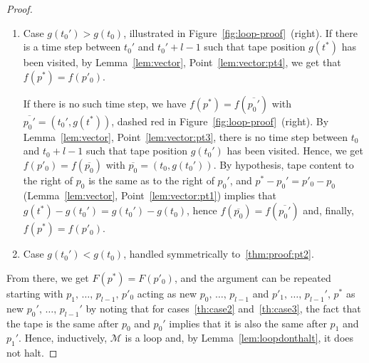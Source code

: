 \begin{proof}
\begin{enumerate}
        \item Case $g(t_0') > g(t_0)$, illustrated in Figure~\ref{fig:loop-proof}~(right). If there is a time step between $t_0'$ and $t_0'+l-1$ such that tape position $g(t^*)$ has been visited, by Lemma~\ref{lem:vector}, Point~\ref{lem:vector:pt4}, we get that $f(p^*) = f(p'_0)$.

              If there is no such time step, we have $f(p^*) = f(\overline{p_0'})$ with $\overline{p_0'} = (t_0',g(t^*))$, dashed red in Figure~\ref{fig:loop-proof}~(right). By Lemma~\ref{lem:vector}, Point~\ref{lem:vector:pt3}, there is no time step between $t_0$ and $t_0+l-1$ such that tape position $g(t_0')$ has been visited. Hence, we  get $f(p'_0) = f(\overline{p_0})$ with $\overline{p_0} = (t_0,g(t_0'))$. By hypothesis, tape content to the right of $p_0$ is the same as to the right of $p_0'$, and $p^*-p_0' = p'_0 - p_0$ (Lemma~\ref{lem:vector}, Point~\ref{lem:vector:pt1}) implies that $g(t^*)-g(t_0') = g(t_0') - g(t_0)$, hence $f(\overline{p_0}) = f(\overline{p_0'})$ and, finally, $f(p^*) = f(p'_0)$.\label{thm:proof:pt2}
        \item Case $g(t_0') < g(t_0)$, handled symmetrically to~\ref{thm:proof:pt2}.
    \end{enumerate}
    From there, we get $F(p^*) = F(p'_0)$, and the argument can be repeated starting with $p_1,\, \dots,\, p_{l-1},\, p'_0$ acting as new $p_0,\,\dots,\,p_{l-1}$ and $p'_1,\, \dots,\, p_{l-1}',\, p^*$ as new $p_0',\,\dots,\,p_{l-1}'$ by noting that for cases~\ref{th:case2} and~\ref{th:case3}, the fact that the tape is the same after $p_0$ and $p_0'$ implies that it is also the same after $p_1$ and $p_1'$. Hence, inductively, $\mathcal{M}$ is a loop and, by Lemma~\ref{lem:loopdonthalt}, it does not halt.
\end{proof}


